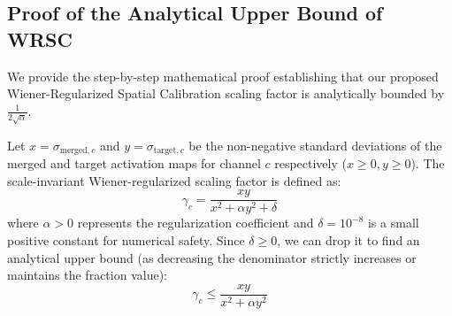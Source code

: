 \documentclass{article}
\theoremstyle{plain}
\theoremstyle{definition}
\theoremstyle{remark}
\begin{document}
\subsection{Proof of the Analytical Upper Bound of WRSC}
We provide the step-by-step mathematical proof establishing that our proposed Wiener-Regularized Spatial Calibration scaling factor is analytically bounded by $\frac{1}{2\sqrt{\alpha}}$.

Let $x = \sigma_{\text{merged}, c}$ and $y = \sigma_{\text{target}, c}$ be the non-negative standard deviations of the merged and target activation maps for channel $c$ respectively ($x \ge 0, y \ge 0$). The scale-invariant Wiener-regularized scaling factor is defined as:
\begin{equation}
\gamma_c = \frac{x y}{x^2 + \alpha y^2 + \delta}
\end{equation}
where $\alpha > 0$ represents the regularization coefficient and $\delta = 10^{-8}$ is a small positive constant for numerical safety. Since $\delta \ge 0$, we can drop it to find an analytical upper bound (as decreasing the denominator strictly increases or maintains the fraction value):
\begin{equation}
\gamma_c \le \frac{x y}{x^2 + \alpha y^2}
\end{equation}
\end{document}
